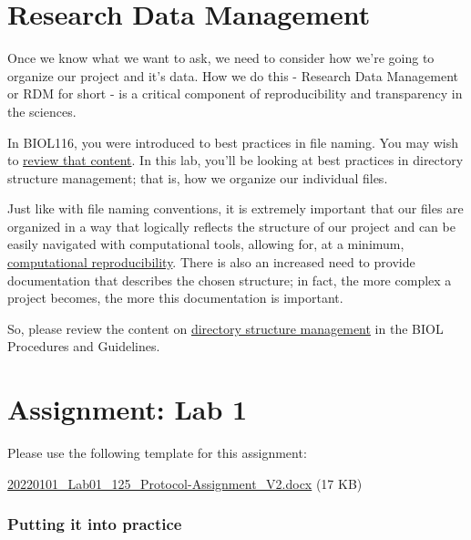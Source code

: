 \documentclass[
]{book}
\begin{document}
\hypertarget{research-data-management}{%
\chapter*{Research Data Management}\label{research-data-management}}

Once we know what we want to ask, we need to consider how we're going to organize our project and it's data. How we do this - Research Data Management or RDM for short - is a critical component of reproducibility and transparency in the sciences.

In BIOL116, you were introduced to best practices in file naming. You may wish to \href{https://ubco-biology.github.io/Procedures-and-Guidelines/file-naming.html}{review that content}. In this lab, you'll be looking at best practices in directory structure management; that is, how we organize our individual files.

Just like with file naming conventions, it is extremely important that our files are organized in a way that logically reflects the structure of our project and can be easily navigated with computational tools, allowing for, at a minimum, \href{https://ubco-biology.github.io/BIOL-116-Lab-Manual/computational-reproducibility.html}{computational reproducibility}. There is also an increased need to provide documentation that describes the chosen structure; in fact, the more complex a project becomes, the more this documentation is important.

So, please review the content on \href{https://ubco-biology.github.io/Procedures-and-Guidelines/directory-structures.html}{directory structure management} in the BIOL Procedures and Guidelines.

\hypertarget{assignment-lab-1}{%
\chapter*{Assignment: Lab 1}\label{assignment-lab-1}}

Please use the following template for this assignment:

\href{files/20220101_Lab01_125_Protocol-Assignment_V2.docx}{20220101\_Lab01\_125\_Protocol-Assignment\_V2.docx} (17 KB)

\hypertarget{putting-it-into-practice}{%
\subsection*{Putting it into practice}\label{putting-it-into-practice}}
\end{document}
